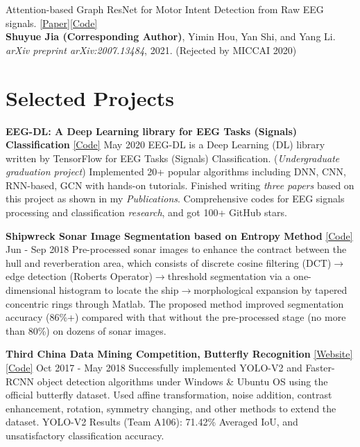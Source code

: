\documentclass{my_cv}
\begin{document}
\workitemsone
{Attention-based Graph ResNet for Motor Intent Detection from Raw EEG signals. \href{https://arxiv.org/abs/2007.13484}{[Paper]}\href{https://github.com/SuperBruceJia/EEG-DL}{[Code]}\\
	\textbf{Shuyue Jia (Corresponding Author)}, Yimin Hou, Yan Shi, and Yang Li.\\
	\emph{arXiv preprint arXiv:2007.13484}, 2021. (Rejected by MICCAI 2020)}

\hspace*{\fill}

\section{Selected Projects}
\noindent \textbf{EEG-DL: A Deep Learning library for EEG Tasks (Signals) Classification} \href{https://github.com/SuperBruceJia/EEG-DL}{[Code]} \hfill May 2020 
\workitemsfour
{EEG-DL is a Deep Learning (DL) library written by TensorFlow for EEG Tasks (Signals) Classification. (\emph{Undergraduate graduation project})}
{Implemented 20+ popular algorithms including DNN, CNN, RNN-based, GCN with hands-on tutorials.}
{Finished writing \emph{three papers} based on this project as shown in my \emph{Publications}.}
{Comprehensive codes for EEG signals processing and classification \emph{research}, and got 100+ GitHub stars.}

\hspace*{\fill} 

\noindent \textbf{Shipwreck Sonar Image Segmentation based on Entropy Method} \href{https://github.com/SuperBruceJia/Sonar-Image-Segmentation-through-Entropy-Method}{[Code]} \hfill Jun - Sep 2018 
\workitemstwo
{Pre-processed sonar images to enhance the contract between the hull and reverberation area, which consists of discrete cosine filtering (DCT)$\rightarrow$edge detection (Roberts Operator)$\rightarrow$threshold segmentation via a one-dimensional histogram to locate the ship$\rightarrow$morphological expansion by tapered concentric rings through Matlab.}
{The proposed method improved segmentation accuracy (86\%+) compared with that without the pre-processed stage (no more than 80\%) on dozens of sonar images.}

\hspace*{\fill} 

\noindent \textbf{Third China Data Mining Competition, Butterfly Recognition} \href{https://ccdm2018.sdufe.edu.cn/info/1012/1212.htm}{[Website]}  \href{https://github.com/SuperBruceJia/YOLO-V2-Object-Detection-Implementation}{[Code]} \hfill Oct 2017 - May 2018 
\workitemsthree
{Successfully implemented YOLO-V2 and Faster-RCNN object detection algorithms under Windows \& Ubuntu OS using the official butterfly dataset.}
{Used affine transformation, noise addition, contrast enhancement, rotation, symmetry changing, and other methods to extend the dataset.}
{YOLO-V2 Results (Team A106): 71.42\% Averaged IoU, and unsatisfactory classification accuracy.}
\end{document}
